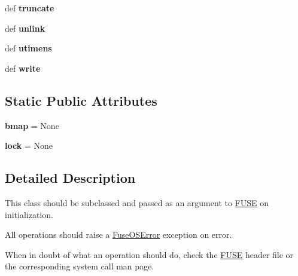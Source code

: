 \begin{DoxyCompactItemize}
\item 
\hypertarget{classfuse_1_1Operations_ad06ab5c8ef730d111b429f1687ac3846}{def {\bfseries truncate}}\label{classfuse_1_1Operations_ad06ab5c8ef730d111b429f1687ac3846}

\item 
\hypertarget{classfuse_1_1Operations_ab439c4c1af908aab40491b100acd0119}{def {\bfseries unlink}}\label{classfuse_1_1Operations_ab439c4c1af908aab40491b100acd0119}

\item 
\hypertarget{classfuse_1_1Operations_a45405970e34873591b129e78fe5d7779}{def {\bfseries utimens}}\label{classfuse_1_1Operations_a45405970e34873591b129e78fe5d7779}

\item 
\hypertarget{classfuse_1_1Operations_a09b2c8fb77204c808233dc74eb9bb0a6}{def {\bfseries write}}\label{classfuse_1_1Operations_a09b2c8fb77204c808233dc74eb9bb0a6}

\end{DoxyCompactItemize}
\subsection*{Static Public Attributes}
\begin{DoxyCompactItemize}
\item 
\hypertarget{classfuse_1_1Operations_ad12b01b16aea9506d94407500d4f0e8e}{{\bfseries bmap} = None}\label{classfuse_1_1Operations_ad12b01b16aea9506d94407500d4f0e8e}

\item 
\hypertarget{classfuse_1_1Operations_aad9e4abc84ae5f2def22429bf54a0dba}{{\bfseries lock} = None}\label{classfuse_1_1Operations_aad9e4abc84ae5f2def22429bf54a0dba}

\end{DoxyCompactItemize}


\subsection{Detailed Description}
This class should be subclassed and passed as an argument to \hyperlink{classfuse_1_1FUSE}{F\-U\-S\-E} on initialization. 

All operations should raise a \hyperlink{classfuse_1_1FuseOSError}{Fuse\-O\-S\-Error} exception on error.

When in doubt of what an operation should do, check the \hyperlink{classfuse_1_1FUSE}{F\-U\-S\-E} header file or the corresponding system call man page. 

